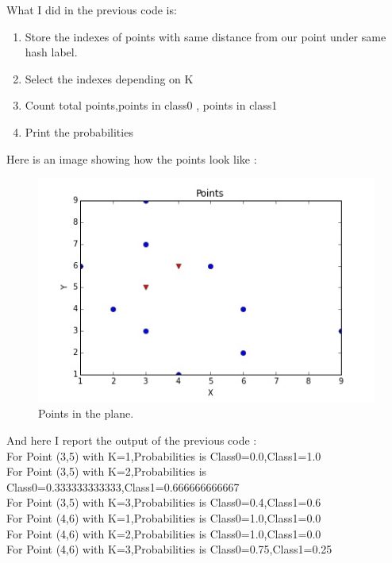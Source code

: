 \documentclass{article}
\begin{document}
What  I did in the previous code is:
\begin{enumerate}
	\item Store the indexes of points with same distance from our point under same hash label.
	\item Select the indexes depending on K
	\item Count total points,points in class0 , points in class1
	\item Print the probabilities
\end{enumerate}
Here is an image showing how the points look like :
\begin{figure}[H]
\includegraphics[scale=1]{points.jpg}
\caption{Points in the plane.}
\end{figure}
And here I report the output of the previous code :\\
For Point (3,5) with K=1,Probabilities is Class0=0.0,Class1=1.0\\
For Point (3,5) with K=2,Probabilities is Class0=0.333333333333,Class1=0.666666666667\\
For Point (3,5) with K=3,Probabilities is Class0=0.4,Class1=0.6\\
For Point (4,6) with K=1,Probabilities is Class0=1.0,Class1=0.0\\
For Point (4,6) with K=2,Probabilities is Class0=1.0,Class1=0.0\\
For Point (4,6) with K=3,Probabilities is Class0=0.75,Class1=0.25
\end{document}

